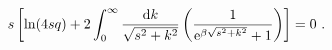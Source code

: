 \begin{equation}
s \left[ \ln (4s q) +2 \int_0^{\infty}\frac{{\rm d}k}{\sqrt{s^2+k^2}}
\left( \frac{1}{{\rm e}^{\beta \sqrt{s^2+k^2}}+1}\right) \right] = 0 \ .
\label{t33}
\end{equation}

